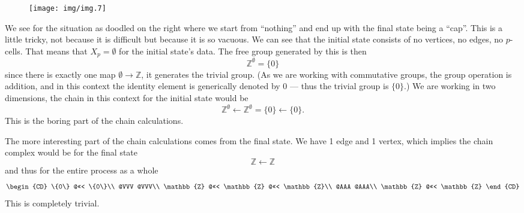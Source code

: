 
\begin{wrapfigure}{r}{1.3in}
\texttt{[image: img/img.7]}
\end{wrapfigure}

We see for the situation as doodled on the right where we start
from ``nothing'' and end up with the final state being a
``cap''. This is a little tricky, not because it is difficult but
because it is so vacuous. We can see that the initial state
consists of no vertices, no edges, no $p$-cells. That means that
$X_{p}=\emptyset$ for the initial state's data. The free group
generated by this is then
\begin{equation}%
\mathbb{Z}^{\emptyset} = \{0\}
\end{equation}
since there is exactly one map $\emptyset\to\mathbb{Z}$, it
generates the trivial group. (As we are working with commutative
groups, the group operation is addition, and in this context the
identity element is generically denoted by 0 --- thus the trivial
group is $\{0\}$.) We are working in two dimensions, the chain in
this context for the initial state would be
\begin{equation}%
\mathbb{Z}^{\emptyset}\leftarrow\mathbb{Z}^{\emptyset}=\{0\}\leftarrow\{0\}.
\end{equation}
This is the boring part of the chain calculations.

The more interesting part of the chain calculations comes from
the final state. We have 1 edge and 1 vertex, which implies the
chain complex would be for the final state
\begin{equation}%
\mathbb{Z}\leftarrow\mathbb{Z}
\end{equation}
and thus for the entire process as a whole
\begin{equation}%
\begin{CD}
\{0\}       @<<< \{0\}\\
@VVV              @VVV\\
\mathbb{Z}  @<<< \mathbb{Z} @<<< \mathbb{Z}\\
@AAA              @AAA\\
\mathbb{Z}  @<<< \mathbb{Z}
\end{CD}
\end{equation}
This is completely trivial. 


